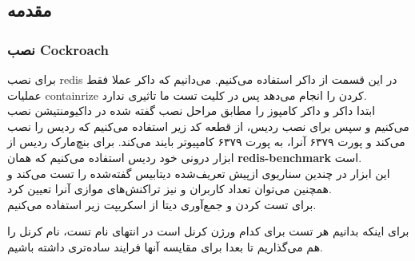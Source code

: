 \subsection{مقدمه}
\subsubsection{نصب Cockroach}
برای نصب 
redis 
در این قسمت از داکر
استفاده می‌کنیم.
می‌دانیم که داکر 
عملا فقط عملیات 
containrize 
کردن را انجام
می‌دهد
پس  در کلیت تست ما 
تاثیری ندارد.
\\
ابتدا داکر و داکر کامپوز را مطابق مراحل نصب گفته شده در
داکیومنتیشن نصب می‌کنیم و سپس 
برای نصب ردیس، از قطعه کد زیر استفاده می‌کنیم که 
ردیس را نصب می‌کند و پورت ۶۳۷۹ آنرا، به پورت ۶۳۷۹ کامپیوتر بایند می‌کند.
برای بنچ‌مارک ردیس از ابزار درونی خود ردیس استفاده می‌کنیم که همان 
\textbf{redis-benchmark}
است.
\\
این ابزار در چندین سناریوی ازپیش‌ تعریف‌‌شده دیتابیس گفته‌شده را تست می‌کند و همچنین می‌توان تعداد کاربران و نیز
تراکنش‌های موازی آنرا تعیین کرد.
\\
برای تست کردن و جمع‌آوری دیتا از اسکریپت زیر استفاده می‌کنیم.
\begin{latin}
\end{latin}
\noindent
برای اینکه بدانیم هر تست برای کدام ورژن کرنل است در انتهای نام تست، نام کرنل را هم می‌گذاریم تا بعدا برای 
مقایسه آنها فرایند ساده‌تری داشته باشیم.

